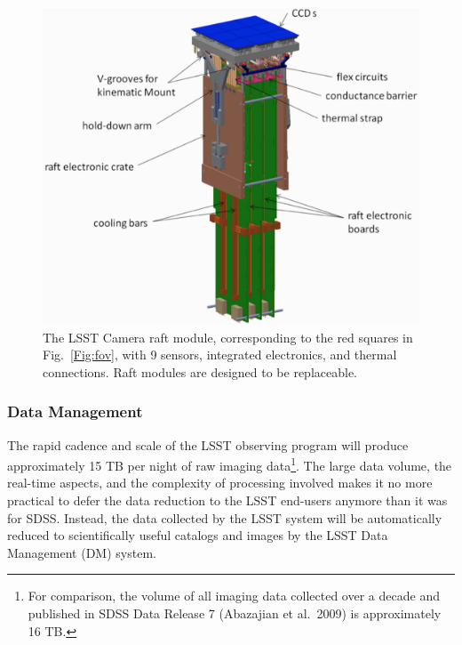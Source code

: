 \begin{figure}[ht]
\includegraphics[width=1.\hsize,clip]{raft-updated-cropped.pdf}
\caption{The LSST Camera raft module, corresponding to the red squares
in Fig.~\ref{Fig:fov}, with 9 sensors, integrated electronics,
and thermal connections. Raft modules are designed to be replaceable.}
\label{Fig:raft}
\end{figure}



\vskip 0.2in
\subsubsection{ Data Management }
\label{sec:dm}

The rapid cadence and scale of the LSST observing program will produce
approximately 15 TB per night of raw imaging data\footnote{For
  comparison, the volume of all imaging data collected over a decade
  and published in SDSS Data Release 7 (Abazajian et al.~2009) is approximately 16 TB.}. The large data volume, the real-time aspects, and the complexity of processing involved makes it no more practical to defer the data reduction to the LSST end-users anymore than it was for SDSS. Instead, the data collected by the LSST system will be automatically reduced to scientifically useful catalogs and images by the LSST Data Management (DM) system.
\\

